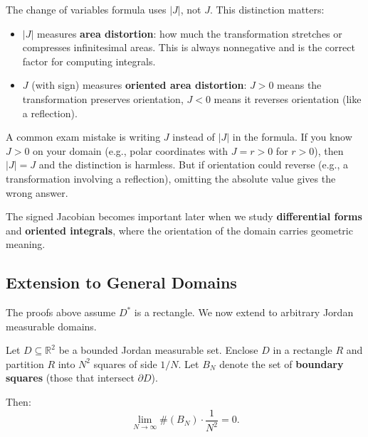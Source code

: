\documentclass[11pt]{report}
\newcommand{\R}{\mathbb{R}}
\begin{document}
\begin{remark}
The change of variables formula uses $|J|$, not $J$. This distinction matters:
\begin{itemize}
    \item $|J|$ measures \textbf{area distortion}: how much the transformation stretches or compresses infinitesimal areas. This is always nonneg\-ative and is the correct factor for computing integrals.
    \item $J$ (with sign) measures \textbf{oriented area distortion}: $J > 0$ means the transformation preserves orientation, $J < 0$ means it reverses orientation (like a reflection).
\end{itemize}

A common exam mistake is writing $J$ instead of $|J|$ in the formula. If you know $J > 0$ on your domain (e.g., polar coordinates with $J = r > 0$ for $r > 0$), then $|J| = J$ and the distinction is harmless. But if orientation could reverse (e.g., a transformation involving a reflection), omitting the absolute value gives the wrong answer.

The signed Jacobian becomes important later when we study \textbf{differential forms} and \textbf{oriented integrals}, where the orientation of the domain carries geometric meaning.
\end{remark}

\subsection*{Extension to General Domains}

The proofs above assume $D^*$ is a rectangle. We now extend to arbitrary Jordan measurable domains.

\begin{proposition}
\label{prop:boundary-squares}
Let $D \subseteq \R^2$ be a bounded Jordan measurable set. Enclose $D$ in a rectangle $R$ and partition $R$ into $N^2$ squares of side $1/N$. Let $B_N$ denote the set of \textbf{boundary squares} (those that intersect $\partial D$).

Then:
\[
\lim_{N \to \infty} \#(B_N) \cdot \frac{1}{N^2} = 0.
\]
\end{proposition}
\end{document}
